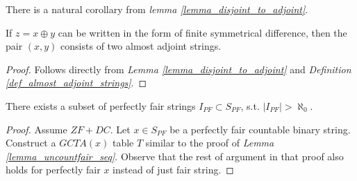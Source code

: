 There is a natural corollary from \textit{lemma \ref{lemma_disjoint_to_adjoint}}.

\begin{corollary}
  If $z = x \oplus y$ can be written in the form of finite symmetrical difference, then the pair $(x,y)$ consists of two almost adjoint strings.
\end{corollary}
\begin{proof}
  Follows directly from \textit{Lemma \ref{lemma_disjoint_to_adjoint}} and \textit{Definition \ref{def_almost_adjoint_strings}}.
\end{proof}



\begin{lemma}\label{lemma_uncount_pf}
  There exists a subset of perfectly fair strings $I_{PF} \subset S_{PF}$, s.t. $|I_{PF}| > \aleph_0$.
\end{lemma}
\begin{proof}
  Assume $ZF + DC$. Let $x \in S_{PF}$ be a perfectly fair countable binary string. Construct a $GCTA(x)$ table $T$ similar to the proof of \textit{Lemma \ref{lemma_uncountfair_seq}}. Observe that the rest of argument in that proof also holds for perfectly fair $x$ instead of just fair string.
\end{proof}

\pagebreak

